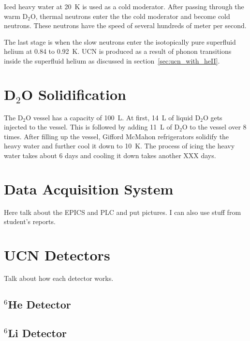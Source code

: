 Iced heavy water at 20~K is used as a cold moderator. After passing
through the warm D$_2$O, thermal neutrons enter the the cold moderator
and become cold neutrons. These neutrons have the speed of several
hundreds of meter per second.

The last stage is when the slow neutrons enter the isotopically pure superfluid helium
at 0.84 to 0.92~K. UCN is produced as a result of phonon transitions
inside the superfluid helium as discussed in section~\ref{sec:ucn_with_heII}.


\section{D$_2$O Solidification}
The D$_2$O vessel has a capacity of 100~L. At first, 14~L of liquid
D$_2$O gets injected to the vessel. This is followed by adding 11~L of
D$_2$O to the vessel over 8 times.  After filling up the vessel,
Gifford McMahon refrigerators solidify the heavy water and further
cool it down to 10~K. The process of icing the heavy water takes about
6 days and cooling it down takes another XXX days.

\section{Data Acquisition System}
Here talk about the EPICS and PLC and put pictures. I can also use
stuff from student's reports.

\section{UCN Detectors}
Talk about how each detector works.
\subsection{$^6$He Detector}
\subsection{$^6$Li Detector}




